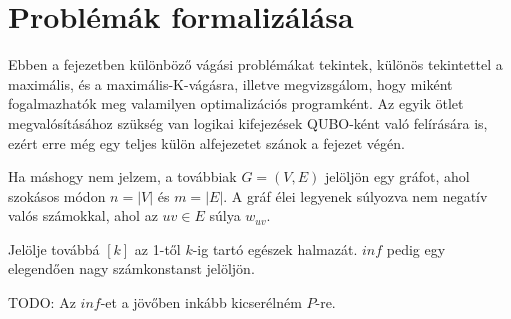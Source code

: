 
\chapter{Problémák formalizálása}\label{chap:cuts}


Ebben a fejezetben különböző vágási problémákat tekintek, különös tekintettel a maximális, és a maximális-K-vágásra, illetve megvizsgálom, hogy miként fogalmazhatók meg valamilyen optimalizációs programként. Az egyik ötlet megvalósításához szükség van logikai kifejezések QUBO-ként való felírására is, ezért erre még egy teljes külön alfejezetet szánok a fejezet végén.

Ha máshogy nem jelzem, a továbbiak $G=(V,E)$ jelöljön egy gráfot, ahol szokásos módon $n=|V|$ és $m=|E|$. A gráf élei legyenek súlyozva nem negatív valós számokkal, ahol az $uv \in E$ súlya $w_{uv}$.

Jelölje továbbá $[k]$ az 1-től $k$-ig tartó egészek halmazát. $inf$ pedig egy elegendően nagy számkonstanst jelöljön.

TODO: Az $inf$-et a jövőben inkább kicserélném $P$-re.

